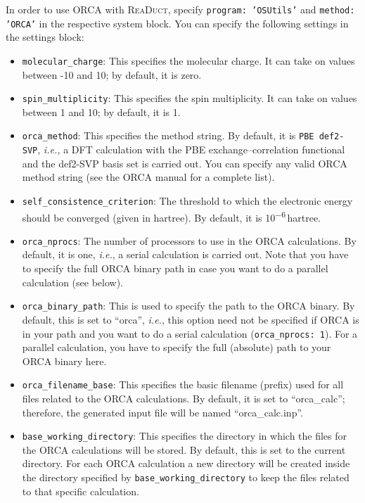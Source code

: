 \documentclass[]{tufte-book}
\begin{document}
In order to use ORCA with \textsc{ReaDuct}, specify \texttt{program: 'OSUtils'} and \texttt{method: 'ORCA'} in 
the respective system block. You can specify the following settings in the settings block:
\begin{itemize}
\item \texttt{molecular\_charge}: This specifies the molecular charge. It can take on values between -10 and 10; by default,
it is zero.
\item \texttt{spin\_multiplicity}: This specifies the spin multiplicity. It can take on values between 1 and 10; by default,
it is 1.
\item \texttt{orca\_method}: This specifies the method string. By default, it is \texttt{PBE def2-SVP}, \textit{i.e.,} a
DFT calculation with the PBE exchange--correlation functional and the def2-SVP basis set is carried out. You can specify
any valid ORCA method string (see the ORCA manual for a complete list).
\item \texttt{self\_consistence\_criterion}: The threshold to which the electronic energy should be converged (given in
hartree). By default, it is 10\textsuperscript{$-$6}\,hartree.
\item \texttt{orca\_nprocs}: The number of processors to use in the ORCA calculations. By default, it is one, \textit{i.e.},
a serial calculation is carried out. Note that you have to specify the full ORCA binary path in case you want to do a
parallel calculation (see below).
\item \texttt{orca\_binary\_path}: This is used to specify the path to the ORCA binary. By default, this is set to
``orca'', \textit{i.e.}, this option need not be specified if ORCA is in your path and you want to do a serial
calculation (\texttt{orca\_nprocs: 1}). For a parallel calculation, you have to specify the full (absolute) path to
your ORCA binary here.
\item \texttt{orca\_filename\_base}: This specifies the basic filename (prefix) used for all files related to the ORCA calculations.
By default, it is set to ``orca\_calc''; therefore, the generated input file will be named ``orca\_calc.inp''.
\item \texttt{base\_working\_directory}: This specifies the directory in which the files for the ORCA calculations will
be stored. By default, this is set to the current directory. For each ORCA calculation a new directory will be
created inside the directory specified by \texttt{base\_working\_directory} to keep the files related to that specific
calculation.
\end{itemize}
\end{document}
